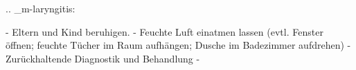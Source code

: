 %
%

.. _m-laryngitis:


\begin{itemize}
    -   Eltern und Kind beruhigen.
    -   Feuchte Luft einatmen lassen (evtl. Fenster
    öffnen; feuchte Tücher im Raum aufhängen; Dusche im Badezimmer aufdrehen)
    -   Zurückhaltende Diagnostik 
    und Behandlung %
    -   
\end{itemize}
